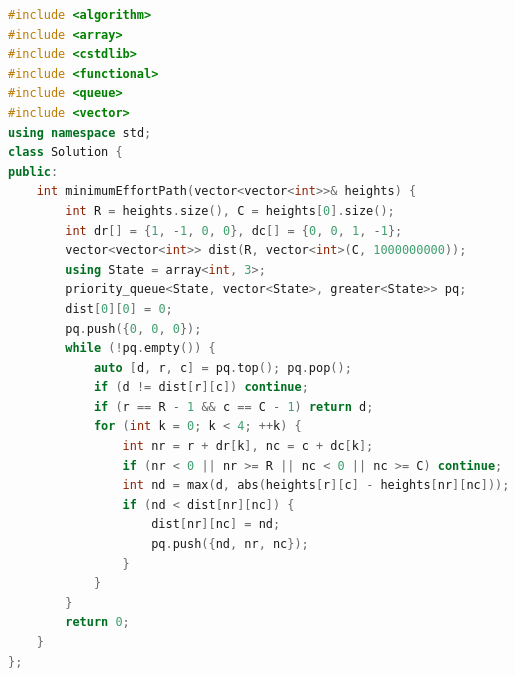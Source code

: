 \documentclass[11pt]{article}
\begin{document}
\begin{lstlisting}[language=C++,caption={P05 --- C++17},label={lst:p05-cpp}]
#include <algorithm>
#include <array>
#include <cstdlib>
#include <functional>
#include <queue>
#include <vector>
using namespace std;
class Solution {
public:
    int minimumEffortPath(vector<vector<int>>& heights) {
        int R = heights.size(), C = heights[0].size();
        int dr[] = {1, -1, 0, 0}, dc[] = {0, 0, 1, -1};
        vector<vector<int>> dist(R, vector<int>(C, 1000000000));
        using State = array<int, 3>;
        priority_queue<State, vector<State>, greater<State>> pq;
        dist[0][0] = 0;
        pq.push({0, 0, 0});
        while (!pq.empty()) {
            auto [d, r, c] = pq.top(); pq.pop();
            if (d != dist[r][c]) continue;
            if (r == R - 1 && c == C - 1) return d;
            for (int k = 0; k < 4; ++k) {
                int nr = r + dr[k], nc = c + dc[k];
                if (nr < 0 || nr >= R || nc < 0 || nc >= C) continue;
                int nd = max(d, abs(heights[r][c] - heights[nr][nc]));
                if (nd < dist[nr][nc]) {
                    dist[nr][nc] = nd;
                    pq.push({nd, nr, nc});
                }
            }
        }
        return 0;
    }
};
\end{lstlisting}
\end{document}
